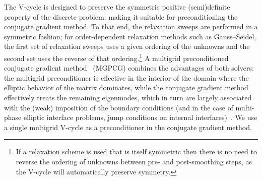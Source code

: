 The V-cycle is designed to preserve the symmetric positive (semi)definite property of the discrete problem, making it suitable for preconditioning the conjugate gradient method. To that end, the relaxation sweeps are performed in a symmetric fashion; for order-dependent relaxation methods such as Gauss--Seidel, the first set of relaxation sweeps uses a given ordering of the unknowns and the second set uses the reverse of that ordering.\footnote{If a relaxation scheme is used that is itself symmetric then there is no need to reverse the ordering of unknowns between pre- and post-smoothing steps, as the V-cycle will automatically preserve symmetry.} A multigrid preconditioned conjugate gradient method~\cite{Tatebe_93_01} (MGPCG) combines the advantages of both solvers: the multigrid preconditioner is effective in the interior of the domain where the elliptic behavior of the matrix dominates, while the conjugate gradient method effectively treats the remaining eigenmodes, which in turn are largely associated with the (weak) imposition of the boundary conditions (and in the case of multi-phase elliptic interface problems, jump conditions on internal interfaces)~\cite{Sussman_99_01,Saye_17_01}. We use a single multigrid V-cycle as a preconditioner in the conjugate gradient method.

